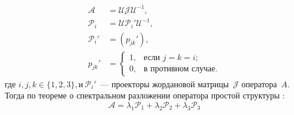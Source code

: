 $$
	\begin{aligned}
		\mathcal{A} &= \mathcal{U}\mathcal{J}\mathcal{U}^{-1}, \\
		\mathcal{P}_i &= \mathcal{U}\mathcal{P}_i'\mathcal{U}^{-1}, \\
		\mathcal{P}_i' &= \left(p_{jk}'\right), \\
		p_{jk}' &= 
		\begin{cases}
			1, & \text{если $j=k=i$;} \\
			0, & \text{в противном случае.}
		\end{cases}
	\end{aligned}
$$
где $i,j,k \in \{1,2,3\}, \text{и}\  \mathcal{P}_i'$~--- проекторы жордановой матрицы~$\mathcal{J}$ 
оператора~$A$. Тогда по теореме о спектральном разложении оператора простой структуры \cite{baskakov}:
$$
	\mathcal{A} = \lambda_1\mathcal{P}_1 + \lambda_2\mathcal{P}_2 + \lambda_3\mathcal{P}_3 
$$


